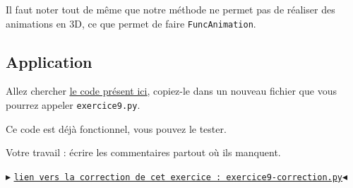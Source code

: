 \documentclass[11pt]{article}
\begin{document}
Il faut noter tout de même que notre méthode ne permet pas de réaliser des animations en 3D, ce que permet de faire \texttt{FuncAnimation}.










\subsection{Application}

Allez chercher  \href{https://github.com/formationPythonPC-Juin/aides-formation/blob/master/exercice9-aide.py}{\underline{le code présent ici}}, copiez-le dans un nouveau fichier que vous pourrez appeler \texttt{exercice9.py}.

\medskip
Ce code est déjà fonctionnel, vous pouvez le tester.

\medskip
Votre travail : écrire les commentaires partout où ils manquent.




\bigskip






\begin{center}
$\blacktriangleright$ \href{https://github.com/formationPythonPC-Juin/corrections-formation/blob/master/exercice9-correction.py}{\underline{\texttt{lien vers la correction de cet exercice : exercice9-correction.py}}}$\blacktriangleleft$                                                                                                                                                                    \end{center}










\newpage




 
 
 
\end{document}
